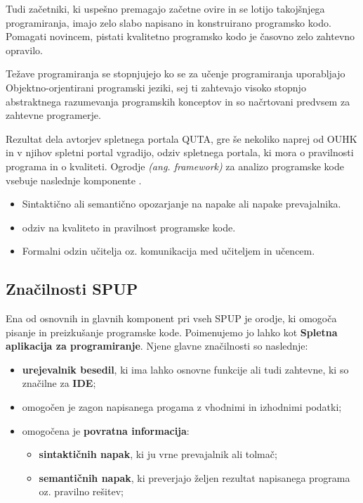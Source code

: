 Tudi začetniki, ki uspešno premagajo začetne ovire in se lotijo
takojšnjega programiranja, imajo zelo slabo napisano in konstruirano
programsko kodo. Pomagati novincem, pistati kvalitetno programsko kodo
je časovno zelo zahtevno opravilo.

Težave programiranja se stopnjujejo ko se za učenje programiranja
uporabljajo Objektno-orjentirani programski jeziki, sej ti zahtevajo
visoko stopnjo abstraktnega razumevanja programskih konceptov in so
načrtovani predvsem za zahtevne programerje.


Rezultat dela avtorjev spletnega portala QUTA, gre še nekoliko naprej
od OUHK in v njihov spletni portal vgradijo, odziv spletnega portala,
ki mora o pravilnosti programa in o kvaliteti. Ogrodje
\emph{(ang. framework)} za analizo programske kode vsebuje naslednje
komponente \cite{thesisAWebP}.

\begin{itemize}
\tightlist
\item
  Sintaktično ali semantično opozarjanje na napake ali napake
  prevajalnika.
\item
  odziv na kvaliteto in pravilnost programske kode.
\item
  Formalni odzin učitelja oz. komunikacija med učiteljem in učencem.
\end{itemize}

\subsection{Značilnosti SPUP}
\label{sec:značilnosti_spup}

Ena od osnovnih in glavnih komponent pri vseh SPUP je orodje, ki
omogoča pisanje in preizkušanje programske kode. Poimenujemo jo lahko
kot \textbf{Spletna aplikacija za programiranje}. Njene
glavne značilnosti so naslednje:

\begin{itemize}
  \item \textbf{urejevalnik besedil}, ki ima lahko osnovne funkcije ali tudi
  zahtevne, ki so značilne za \textbf{IDE};
\item omogočen je zagon napisanega progama z vhodnimi in izhodnimi
  podatki;
\item omogočena je \textbf{povratna informacija}:
  \begin{itemize}
    \tightlist
  \item \textbf{sintaktičnih napak}, ki ju vrne prevajalnik ali tolmač;
  \item \textbf{semantičnih napak}, ki preverjajo željen rezultat napisanega
    programa oz. pravilno rešitev;
  \end{itemize}
\end{itemize}

